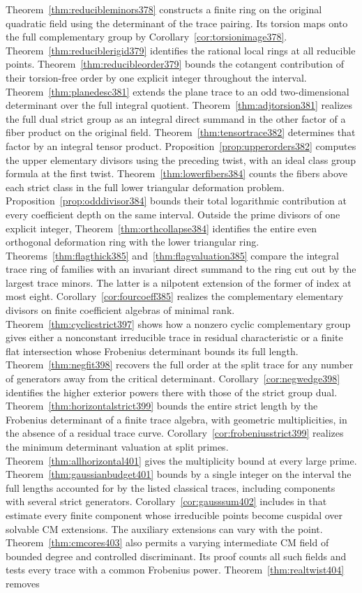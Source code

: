 \documentclass[a4paper,11pt]{article}
\theoremstyle{definition}
\theoremstyle{remark}
\numberwithin{equation}{section}
\begin{document}
Theorem~\ref{thm:reducibleminors378} constructs a finite ring on the original quadratic field using the determinant of the trace pairing. Its torsion maps onto the full complementary group by Corollary~\ref{cor:torsionimage378}. Theorem~\ref{thm:reduciblerigid379} identifies the rational local rings at all reducible points. Theorem~\ref{thm:reducibleorder379} bounds the cotangent contribution of their torsion-free order by one explicit integer throughout the interval. Theorem~\ref{thm:planedesc381} extends the plane trace to an odd two-dimensional determinant over the full integral quotient. Theorem~\ref{thm:adjtorsion381} realizes the full dual strict group as an integral direct summand in the other factor of a fiber product on the original field. Theorem~\ref{thm:tensortrace382} determines that factor by an integral tensor product. Proposition~\ref{prop:upperorders382} computes the upper elementary divisors using the preceding twist, with an ideal class group formula at the first twist. Theorem~\ref{thm:lowerfibers384} counts the fibers above each strict class in the full lower triangular deformation problem. Proposition~\ref{prop:odddivisor384} bounds their total logarithmic contribution at every coefficient depth on the same interval. Outside the prime divisors of one explicit integer, Theorem~\ref{thm:orthcollapse384} identifies the entire even orthogonal deformation ring with the lower triangular ring. Theorems~\ref{thm:flagthick385} and~\ref{thm:flagvaluation385} compare the integral trace ring of families with an invariant direct summand to the ring cut out by the largest trace minors. The latter is a nilpotent extension of the former of index at most eight. Corollary~\ref{cor:fourcoeff385} realizes the complementary elementary divisors on finite coefficient algebras of minimal rank. Theorem~\ref{thm:cyclicstrict397} shows how a nonzero cyclic complementary group gives either a nonconstant irreducible trace in residual characteristic or a finite flat intersection whose Frobenius determinant bounds its full length. Theorem~\ref{thm:negfit398} recovers the full order at the split trace for any number of generators away from the critical determinant. Corollary~\ref{cor:negwedge398} identifies the higher exterior powers there with those of the strict group dual. Theorem~\ref{thm:horizontalstrict399} bounds the entire strict length by the Frobenius determinant of a finite trace algebra, with geometric multiplicities, in the absence of a residual trace curve. Corollary~\ref{cor:frobeniusstrict399} realizes the minimum determinant valuation at split primes. Theorem~\ref{thm:allhorizontal401} gives the multiplicity bound at every large prime. Theorem~\ref{thm:gaussianbudget401} bounds by a single integer on the interval the full lengths accounted for by the listed classical traces, including components with several strict generators. Corollary~\ref{cor:gausssum402} includes in that estimate every finite component whose irreducible points become cuspidal over solvable CM extensions. The auxiliary extensions can vary with the point. Theorem~\ref{thm:cmcores403} also permits a varying intermediate CM field of bounded degree and controlled discriminant. Its proof counts all such fields and tests every trace with a common Frobenius power. Theorem~\ref{thm:realtwist404} removes 
\end{document}
